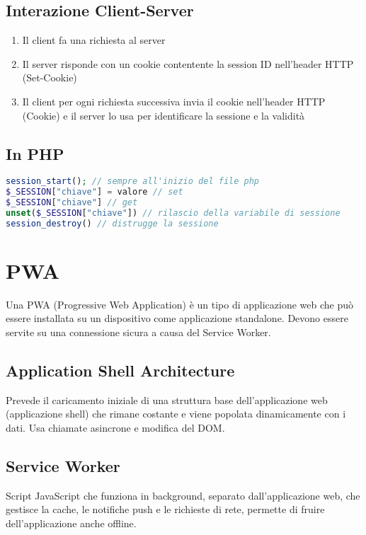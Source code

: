 \documentclass[12pt, a4paper]{article}
\begin{document}
\subsection{Interazione Client-Server}
\begin{enumerate}
    \item Il client fa una richiesta al server
    \item Il server risponde con un cookie contentente la session ID nell'header HTTP (Set-Cookie)
    \item Il client per ogni richiesta successiva invia il cookie nell'header HTTP (Cookie) e il server lo usa per identificare la sessione e la validità
\end{enumerate}
\subsection{In PHP}
\begin{lstlisting}[language=PHP]
session_start(); // sempre all'inizio del file php
$_SESSION["chiave"] = valore // set
$_SESSION["chiave"] // get
unset($_SESSION["chiave"]) // rilascio della variabile di sessione
session_destroy() // distrugge la sessione
\end{lstlisting}
\section{PWA}
Una PWA (Progressive Web Application) è un tipo di applicazione web che può essere installata su un dispositivo come applicazione standalone. Devono essere servite su una connessione sicura a causa del Service Worker.
\subsection{Application Shell Architecture}
Prevede il caricamento iniziale di una struttura base dell'applicazione web (applicazione shell) che rimane costante e viene popolata dinamicamente con i dati. Usa chiamate asincrone e modifica del DOM.
\subsection{Service Worker}
Script JavaScript che funziona in background, separato dall'applicazione web, che gestisce la cache, le notifiche push e le richieste di rete, permette di fruire dell'applicazione anche offline.
\end{document}
